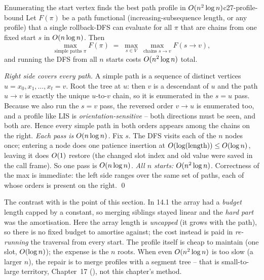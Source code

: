 \begin{theorem}{Enumerating the start vertex finds the best path profile in $O(n^2\log n)$}{c27-profile-bound}
Let $F(\pi)$ be a path functional (increasing-subsequence length, or any profile)
that a single rollback-DFS can evaluate for all $\pi$ that are chains from one fixed
start $s$ in $O(n\log n)$. Then
\[
  \max_{\text{simple paths }\pi} F(\pi) \;=\; \max_{s \in V}\ \max_{\text{chains } s\to v} F(s\!\to\!v),
\]
and running the DFS from all $n$ starts costs $O(n^2\log n)$ total.
\end{theorem}
\begin{proofbox}
\emph{Right side covers every path.} A simple path is a sequence of distinct
vertices $u = x_0, x_1, \dots, x_t = v$. Root the tree at $u$: then $v$ is a
descendant of $u$ and the path $u\!\to\!v$ is exactly the unique $u$-to-$v$ chain,
so it is enumerated in the $s=u$ pass. Because we also run the $s=v$ pass, the
reversed order $v\!\to\!u$ is enumerated too, and a profile like LIS is
\emph{orientation-sensitive} -- both directions must be seen, and both are. Hence
every simple path in both orders appears among the chains on the right.
\emph{Each pass is $O(n\log n)$.} Fix $s$. The DFS visits each of the $n$ nodes
once; entering a node does one patience insertion at $O(\log(\text{length}))
\le O(\log n)$, leaving it does $O(1)$ restore (the changed slot index and
old value were saved in the call frame). So one pass is $O(n\log n)$.
\emph{All $n$ starts:} $O(n^2\log n)$. Correctness of the max is immediate:
the left side ranges over the same set of paths, each of whose orders is present on
the right. \qed
\end{proofbox}

\begin{insightbox}
The contrast with  is the point of this section. In 14.1 the
array had a \emph{budget} length capped by a constant, so merging siblings stayed
linear and the \emph{hard part} was the amortisation. Here the array length is
\emph{uncapped} (it grows with the path), so there is no fixed budget to amortise
against; the cost instead is paid in \emph{re-running} the traversal from every
start. The profile itself is cheap to maintain (one slot, $O(\log n)$); the
expense is the $n$ roots. When even $O(n^2\log n)$ is too slow (a larger $n$),
the repair is to merge profiles with a segment tree -- that is small-to-large
territory, Chapter~17 (), not this chapter's method.
\end{insightbox}

